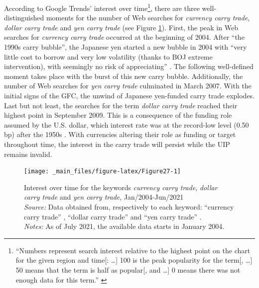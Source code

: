 \documentclass[a4paper, twoside]{templates/ociamthesis}
\begin{document}
According to Google Trends' interest over time\footnote{``Numbers represent search interest relative to the highest point on the chart for the given region and time{[}: \ldots{]} 100 is the peak popularity for the term{[}, \ldots{]} 50 means that the term is half as popular{[}, and \ldots{]} 0 means there was not enough data for this term.'' \autocite{googletrends2021a}}, there are three well-distinguished moments for the number of Web searches for \emph{currency carry trade}, \emph{dollar carry trade} and \emph{yen carry trade} (see Figure \ref{fig:Figure27}). First, the peak in Web searches for \emph{currency carry trade} occurred at the beginning of 2004. After ``the 1990s carry bubble'', the Japanese yen started a new bubble in 2004 with ``very little cost to borrow and very low volatility (thanks to BOJ extreme intervention), with seemingly no risk of appreciating'' \autocite[ 26]{lee2020}. The following well-defined moment takes place with the burst of this new carry bubble. Additionally, the number of Web searches for \emph{yen carry trade} culminated in March 2007. With the initial signs of the GFC, the unwind of Japanese yen-funded carry trade explodes. Last but not least, the searches for the term \emph{dollar carry trade} reached their highest point in September 2009. This is a consequence of the funding role assumed by the U.S. dollar, which interest rate was at the record-low level (0.50 bp) after the 1950s \autocite{internationalmonetaryfund2021a}. With currencies altering their role as funding or target throughout time, the interest in the carry trade will persist while the UIP remains invalid.

\begin{figure}[!ht]

{\centering \texttt{[image: \_main\_files/figure-latex/Figure27-1]} 

}

\caption[Search queries on Google Trends for the keywords \textit{currency carry trade}, \textit{dollar carry trade} and \textit{yen carry trade}, Jan/2004-June/2021]{Interest over time for the keywords \textit{currency carry trade}, \textit{dollar carry trade} and \textit{yen carry trade}, Jan/2004-Jun/2021 \\ \scriptsize \textit{Source:} Data obtained from, respectively to each keyword: ``currency carry trade'' \autocite{googletrends2021b}, ``dollar carry trade'' \autocite{googletrends2021c} and ``yen carry trade'' \autocite{googletrends2021d}. \\ \textit{Notes:} As of July 2021, the available data starts in January 2004.}\label{fig:Figure27}
\end{figure}
\end{document}
